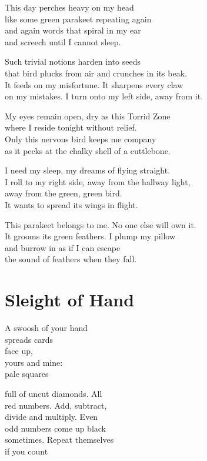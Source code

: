\documentclass[twoside,10pt]{book}
\begin{document}
This day perches heavy on my head\\
like some green parakeet repeating again\\
and again words that spiral in my ear\\
and screech until I cannot sleep.

Such trivial notions harden into seeds\\
that bird plucks from air and crunches in its beak.\\
It feeds on my misfortune. It sharpens every claw\\
on my mistakes. I turn onto my left side, away from it.

My eyes remain open, dry as this Torrid Zone\\
where I reside tonight without relief.\\
Only this nervous bird keeps me company\\
as it pecks at the chalky shell of a cuttlebone.

I need my sleep, my dreams of flying straight.\\
I roll to my right side, away from the hallway light,\\
away from the green, green bird.\\
It wants to spread its wings in flight.

This parakeet belongs to me. No one else will own it.\\
It grooms its green feathers. I plump my pillow\\
and burrow in as if I can escape\\
the sound of feathers when they fall.


\clearpage
\section{Sleight of Hand}

A swoosh of your hand\\
spreads cards\\
face up,\\
yours and mine:\\
pale squares

full of uncut diamonds. All\\
red numbers. Add, subtract,\\
divide and multiply. Even\\
odd numbers come up black\\
sometimes. Repeat themselves\\
if you count
\end{document}

